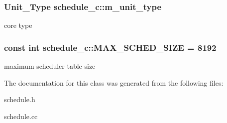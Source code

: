 \hypertarget{classschedule__c_a5fd7913b69e838b56da18de2802d8a71}{
\subsubsection[{m\_\-unit\_\-type}]{\setlength{\rightskip}{0pt plus 5cm}Unit\_\-Type {\bf schedule\_\-c::m\_\-unit\_\-type}}}
\label{classschedule__c_a5fd7913b69e838b56da18de2802d8a71}
core type \hypertarget{classschedule__c_a1421dabfdead10b493bab949d79c2855}{
\subsubsection[{MAX\_\-SCHED\_\-SIZE}]{\setlength{\rightskip}{0pt plus 5cm}const int {\bf schedule\_\-c::MAX\_\-SCHED\_\-SIZE} = 8192}}
\label{classschedule__c_a1421dabfdead10b493bab949d79c2855}
maximum scheduler table size 

The documentation for this class was generated from the following files:\begin{DoxyCompactItemize}
\item 
schedule.h\item 
schedule.cc\end{DoxyCompactItemize}

